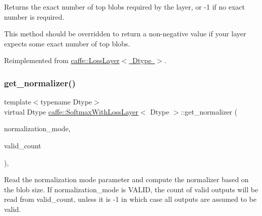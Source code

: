 Returns the exact number of top blobs required by the layer, or -\/1 if no exact number is required. 

This method should be overridden to return a non-\/negative value if your layer expects some exact number of top blobs. 

Reimplemented from \mbox{\hyperlink{classcaffe_1_1_loss_layer_aa5d5ab714a14082f5343dc9c49025b23}{caffe\+::\+Loss\+Layer$<$ Dtype $>$}}.

\mbox{\label{classcaffe_1_1_softmax_with_loss_layer_aeb270fe4b77dfcf49eabd22437242e9f}} 
\subsubsection{\texorpdfstring{get\+\_\+normalizer()}{get\_normalizer()}\hspace{0.1cm}{\footnotesize\ttfamily [1/2]}}
{\footnotesize\ttfamily template$<$typename Dtype$>$ \\
virtual Dtype \mbox{\hyperlink{classcaffe_1_1_softmax_with_loss_layer}{caffe\+::\+Softmax\+With\+Loss\+Layer}}$<$ Dtype $>$\+::get\+\_\+normalizer (\begin{DoxyParamCaption}\item[{Loss\+Parameter\+\_\+\+Normalization\+Mode}]{normalization\+\_\+mode,  }\item[{int}]{valid\+\_\+count }\end{DoxyParamCaption})\hspace{0.3cm}{\ttfamily [protected]}, {\ttfamily [virtual]}}

Read the normalization mode parameter and compute the normalizer based on the blob size. If normalization\+\_\+mode is V\+A\+L\+ID, the count of valid outputs will be read from valid\+\_\+count, unless it is -\/1 in which case all outputs are assumed to be valid. \mbox{\label{classcaffe_1_1_softmax_with_loss_layer_aef4567bafcd7b1665f2a2cc71ea02ff4}} 
